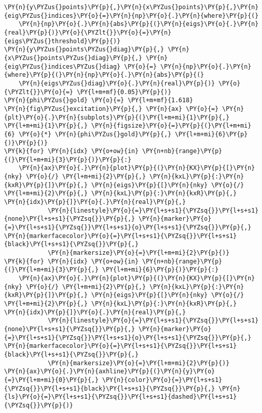 \begin{Verbatim}[commandchars=\\\{\}]
\PY{n}{y\PYZus{}points}\PY{p}{,}\PY{n}{x\PYZus{}points}\PY{p}{,}\PY{n}{eig\PYZus{}indices}\PY{o}{=}\PY{n}{np}\PY{o}{.}\PY{n}{where}\PY{p}{(}
    \PY{n}{np}\PY{o}{.}\PY{n}{abs}\PY{p}{(}\PY{n}{eigs}\PY{o}{.}\PY{n}{real}\PY{p}{)}\PY{o}{\PYZlt{}}\PY{o}{=}\PY{n}{eigs\PYZus{}threshold}\PY{p}{)}
\PY{n}{y\PYZus{}points\PYZus{}diag}\PY{p}{,} \PY{n}{x\PYZus{}points\PYZus{}diag}\PY{p}{,} \PY{n}{eig\PYZus{}indices\PYZus{}diag} \PY{o}{=} \PY{n}{np}\PY{o}{.}\PY{n}{where}\PY{p}{(}\PY{n}{np}\PY{o}{.}\PY{n}{abs}\PY{p}{(}
    \PY{n}{eigs\PYZus{}diag}\PY{o}{.}\PY{n}{real}\PY{p}{)} \PY{o}{\PYZlt{}}\PY{o}{=} \PY{l+m+mf}{0.05}\PY{p}{)}
\PY{n}{phi\PYZus{}gold} \PY{o}{=} \PY{l+m+mf}{1.618}
\PY{n}{fig\PYZus{}excitation}\PY{p}{,} \PY{n}{ax} \PY{o}{=} \PY{n}{plt}\PY{o}{.}\PY{n}{subplots}\PY{p}{(}\PY{l+m+mi}{1}\PY{p}{,} \PY{l+m+mi}{1}\PY{p}{,} \PY{n}{figsize}\PY{o}{=}\PY{p}{(}\PY{l+m+mi}{6} \PY{o}{*} \PY{n}{phi\PYZus{}gold}\PY{p}{,} \PY{l+m+mi}{6}\PY{p}{)}\PY{p}{)}
\PY{k}{for} \PY{n}{idx} \PY{o+ow}{in} \PY{n+nb}{range}\PY{p}{(}\PY{l+m+mi}{3}\PY{p}{)}\PY{p}{:}
    \PY{n}{ax}\PY{o}{.}\PY{n}{plot}\PY{p}{(}\PY{n}{KX}\PY{p}{[}\PY{n}{nky} \PY{o}{/} \PY{l+m+mi}{2}\PY{p}{,} \PY{n}{kxL}\PY{p}{:}\PY{n}{kxR}\PY{p}{]}\PY{p}{,} \PY{n}{eigs}\PY{p}{[}\PY{n}{nky} \PY{o}{/} \PY{l+m+mi}{2}\PY{p}{,} \PY{n}{kxL}\PY{p}{:}\PY{n}{kxR}\PY{p}{,} \PY{n}{idx}\PY{p}{]}\PY{o}{.}\PY{n}{real}\PY{p}{,}
            \PY{n}{linestyle}\PY{o}{=}\PY{l+s+s1}{\PYZsq{}}\PY{l+s+s1}{none}\PY{l+s+s1}{\PYZsq{}}\PY{p}{,} \PY{n}{marker}\PY{o}{=}\PY{l+s+s1}{\PYZsq{}}\PY{l+s+s1}{o}\PY{l+s+s1}{\PYZsq{}}\PY{p}{,} \PY{n}{markerfacecolor}\PY{o}{=}\PY{l+s+s1}{\PYZsq{}}\PY{l+s+s1}{black}\PY{l+s+s1}{\PYZsq{}}\PY{p}{,}
            \PY{n}{markersize}\PY{o}{=}\PY{l+m+mi}{2}\PY{p}{)}
\PY{k}{for} \PY{n}{idx} \PY{o+ow}{in} \PY{n+nb}{range}\PY{p}{(}\PY{l+m+mi}{3}\PY{p}{,} \PY{l+m+mi}{6}\PY{p}{)}\PY{p}{:}
    \PY{n}{ax}\PY{o}{.}\PY{n}{plot}\PY{p}{(}\PY{n}{KX}\PY{p}{[}\PY{n}{nky} \PY{o}{/} \PY{l+m+mi}{2}\PY{p}{,} \PY{n}{kxL}\PY{p}{:}\PY{n}{kxR}\PY{p}{]}\PY{p}{,} \PY{n}{eigs}\PY{p}{[}\PY{n}{nky} \PY{o}{/} \PY{l+m+mi}{2}\PY{p}{,} \PY{n}{kxL}\PY{p}{:}\PY{n}{kxR}\PY{p}{,} \PY{n}{idx}\PY{p}{]}\PY{o}{.}\PY{n}{real}\PY{p}{,}
            \PY{n}{linestyle}\PY{o}{=}\PY{l+s+s1}{\PYZsq{}}\PY{l+s+s1}{none}\PY{l+s+s1}{\PYZsq{}}\PY{p}{,} \PY{n}{marker}\PY{o}{=}\PY{l+s+s1}{\PYZsq{}}\PY{l+s+s1}{o}\PY{l+s+s1}{\PYZsq{}}\PY{p}{,} \PY{n}{markerfacecolor}\PY{o}{=}\PY{l+s+s1}{\PYZsq{}}\PY{l+s+s1}{black}\PY{l+s+s1}{\PYZsq{}}\PY{p}{,}
            \PY{n}{markersize}\PY{o}{=}\PY{l+m+mi}{2}\PY{p}{)}
\PY{n}{ax}\PY{o}{.}\PY{n}{axhline}\PY{p}{(}\PY{n}{y}\PY{o}{=}\PY{l+m+mi}{0}\PY{p}{,} \PY{n}{color}\PY{o}{=}\PY{l+s+s1}{\PYZsq{}}\PY{l+s+s1}{black}\PY{l+s+s1}{\PYZsq{}}\PY{p}{,} \PY{n}{ls}\PY{o}{=}\PY{l+s+s1}{\PYZsq{}}\PY{l+s+s1}{dashed}\PY{l+s+s1}{\PYZsq{}}\PY{p}{)}

\end{Verbatim}
